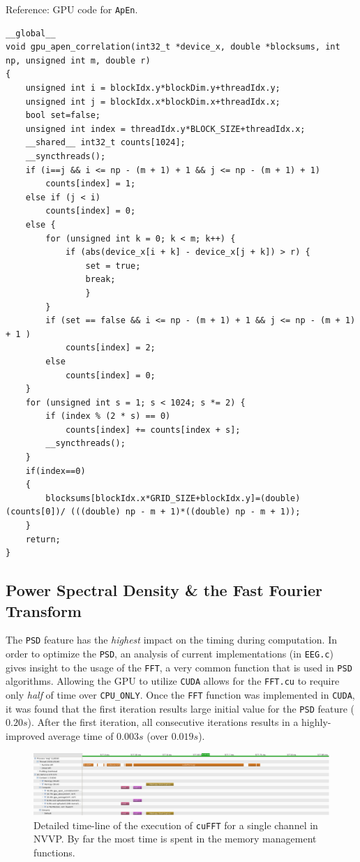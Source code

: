 \documentclass[a4paper]{article}
\begin{document}
\noindent Reference: GPU code for \texttt{ApEn}.
\begin{lstlisting}
__global__
void gpu_apen_correlation(int32_t *device_x, double *blocksums, int np, unsigned int m, double r)
{
	unsigned int i = blockIdx.y*blockDim.y+threadIdx.y;
	unsigned int j = blockIdx.x*blockDim.x+threadIdx.x;
	bool set=false;
	unsigned int index = threadIdx.y*BLOCK_SIZE+threadIdx.x;
	__shared__ int32_t counts[1024];   
	__syncthreads();
	if (i==j && i <= np - (m + 1) + 1 && j <= np - (m + 1) + 1)
		counts[index] = 1;
	else if (j < i)
		counts[index] = 0;
	else {
		for (unsigned int k = 0; k < m; k++) {
			if (abs(device_x[i + k] - device_x[j + k]) > r) {
				set = true;
				break;
				}
		}
		if (set == false && i <= np - (m + 1) + 1 && j <= np - (m + 1) + 1 )
			counts[index] = 2;
		else
			counts[index] = 0;
	}
	for (unsigned int s = 1; s < 1024; s *= 2) {
		if (index % (2 * s) == 0)
			counts[index] += counts[index + s];
		__syncthreads();
	}
	if(index==0)
	{
		blocksums[blockIdx.x*GRID_SIZE+blockIdx.y]=(double)(counts[0])/ (((double) np - m + 1)*((double) np - m + 1));
	}
	return;
}
\end{lstlisting}

\subsection{Power Spectral Density \& the Fast Fourier Transform}

The \texttt{PSD} feature has the \textit{highest} impact on the timing during computation. In order to optimize the \texttt{PSD}, an analysis of current implementations (in \texttt{EEG.c}) gives insight to the usage of the \texttt{FFT}, a very common function that is used in \texttt{PSD} algorithms. Allowing the GPU to utilize \texttt{CUDA} allows for the \texttt{FFT.cu} to require only \textit{half} of time over \texttt{CPU\_ONLY}. Once the \texttt{FFT} function was implemented in \texttt{CUDA}, it was found that the first iteration results large initial value for the \texttt{PSD} feature ($0.20s$). After the first iteration, all consecutive iterations results in a highly-improved average time of $0.003s$ (over $0.019s$). 

\begin{figure}[H]
\begin{center}
\includegraphics[scale=0.35]{images/10_cuda_fft_detail.PNG}
\caption{Detailed time-line of the execution of \texttt{cuFFT} for a single channel in NVVP. By far the most time is spent in the memory management functions.}
\label{fig:GPU_fft_detail}
\end{center}
\end{figure}
\end{document}
